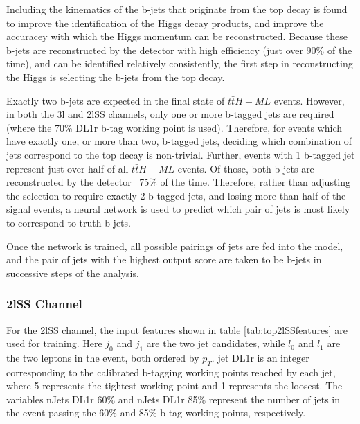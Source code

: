 Including the kinematics of the b-jets that originate from the top decay is found to improve the identification of the Higgs decay products, and improve the accuracey with which the Higgs momentum can be reconstructed. Because these b-jets are reconstructed by the detector with high efficiency (just over 90\% of the time), and can be identified relatively consistently, the first step in reconstructing the Higgs is selecting the b-jets from the top decay.

Exactly two b-jets are expected in the final state of $t\bar{t}H-ML$ events. However, in both the 3l and 2lSS channels, only one or more b-tagged jets are required (where the 70\% DL1r b-tag working point is used). Therefore, for events which have exactly one, or more than two, b-tagged jets, deciding which combination of jets correspond to the top decay is non-trivial. Further, events with 1 b-tagged jet represent just over half of all $t\bar{t}H-ML$ events. Of those, both b-jets are reconstructed by the detector ~75\% of the time. Therefore, rather than adjusting the selection to require exactly 2 b-tagged jets, and losing more than half of the signal events, a neural network is used to predict which pair of jets is most likely to correspond to truth b-jets.

Once the network is trained, all possible pairings of jets are fed into the model, and the pair of jets with the highest output score are taken to be b-jets in successive steps of the analysis. 

\subsubsection{2lSS Channel}
\label{subsec:top2lSS}

For the 2lSS channel, the input features shown in table \ref{tab:top2lSSfeatures} are used for training. Here $j_0$ and $j_1$ are the two jet candidates, while $l_0$ and $l_1$ are the two leptons in the event, both ordered by $p_T$. jet DL1r is an integer corresponding to the calibrated b-tagging working points reached by each jet, where 5 represents the tightest working point and 1 represents the loosest. The variables nJets DL1r 60\% and nJets DL1r 85\% represent the number of jets in the event passing the 60\% and 85\% b-tag working points, respectively.

